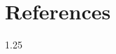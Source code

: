 \documentclass[12pt,a4paper, twoside, openright,titlepage]{book}
\begin{document}
\chapter*{References}{}
\renewcommand{\section}[2]{}%

\renewcommand{\chaptername}{}



  
  \begin{spacing}{1.25}
  
  \end{spacing}
\end{document}
